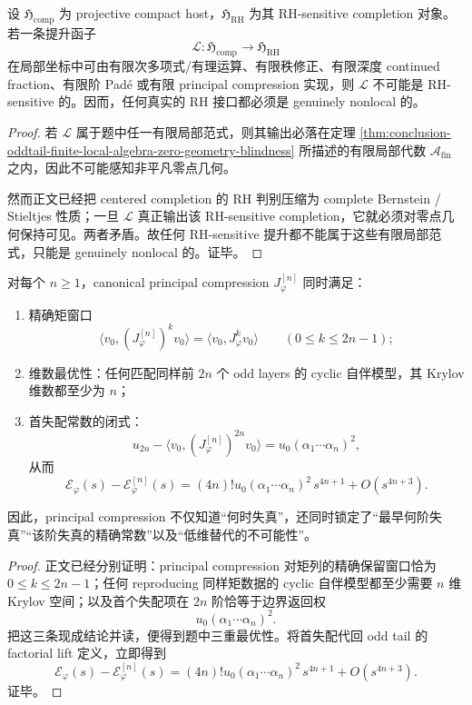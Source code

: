\begin{theorem}\label{thm:conclusion-oddtail-rh-interface-genuinely-nonlocal}
设 \(\mathfrak H_{\mathrm{comp}}\) 为 projective compact host，\(\mathfrak H_{\mathrm{RH}}\) 为其 RH-sensitive completion 对象。若一条提升函子
\[
\mathcal L:\mathfrak H_{\mathrm{comp}}\to \mathfrak H_{\mathrm{RH}}
\]
在局部坐标中可由有限次多项式/有理运算、有限秩修正、有限深度 continued fraction、有限阶 Pad\'e 或有限 principal compression 实现，则 \(\mathcal L\) 不可能是 RH-sensitive 的。因而，任何真实的 RH 接口都必须是 genuinely nonlocal 的。
\end{theorem}
\begin{proof}
若 \(\mathcal L\) 属于题中任一有限局部范式，则其输出必落在定理 \ref{thm:conclusion-oddtail-finite-local-algebra-zero-geometry-blindness} 所描述的有限局部代数 \(\mathcal A_{\mathrm{fin}}\) 之内，因此不可能感知非平凡零点几何。

然而正文已经把 centered completion 的 RH 判别压缩为 complete Bernstein / Stieltjes 性质；一旦 \(\mathcal L\) 真正输出该 RH-sensitive completion，它就必须对零点几何保持可见。两者矛盾。故任何 RH-sensitive 提升都不能属于这些有限局部范式，只能是 genuinely nonlocal 的。证毕。
\end{proof}

\begin{theorem}\label{thm:conclusion-oddtail-principal-compression-triple-optimality}
对每个 \(n\ge 1\)，canonical principal compression \(J_\varphi^{[n]}\) 同时满足：
\begin{enumerate}
  \item 精确矩窗口
  \[
  \langle v_0,(J_\varphi^{[n]})^k v_0\rangle
  =
  \langle v_0,J_\varphi^k v_0\rangle
  \qquad (0\le k\le 2n-1);
  \]
  \item 维数最优性：任何匹配同样前 \(2n\) 个 odd layers 的 cyclic 自伴模型，其 Krylov 维数都至少为 \(n\)；
  \item 首失配常数的闭式：
  \[
  u_{2n}-\langle v_0,(J_\varphi^{[n]})^{2n}v_0\rangle
  =
  u_0(\alpha_1\cdots\alpha_n)^2,
  \]
  从而
  \[
  \mathcal E_\varphi(s)-\mathcal E_\varphi^{[n]}(s)
  =
  (4n)!u_0(\alpha_1\cdots\alpha_n)^2\,s^{4n+1}
  +O(s^{4n+3}).
  \]
\end{enumerate}
因此，principal compression 不仅知道“何时失真”，还同时锁定了“最早何阶失真”“该阶失真的精确常数”以及“低维替代的不可能性”。
\end{theorem}
\begin{proof}
正文已经分别证明：principal compression 对矩列的精确保留窗口恰为 \(0\le k\le 2n-1\)；任何 reproducing 同样矩数据的 cyclic 自伴模型都至少需要 \(n\) 维 Krylov 空间；以及首个失配项在 \(2n\) 阶恰等于边界返回权
\[
u_0(\alpha_1\cdots\alpha_n)^2.
\]
把这三条现成结论并读，便得到题中三重最优性。将首失配代回 odd tail 的 factorial lift 定义，立即得到
\[
\mathcal E_\varphi(s)-\mathcal E_\varphi^{[n]}(s)
=
(4n)!u_0(\alpha_1\cdots\alpha_n)^2\,s^{4n+1}
+O(s^{4n+3}).
\]
证毕。
\end{proof}

